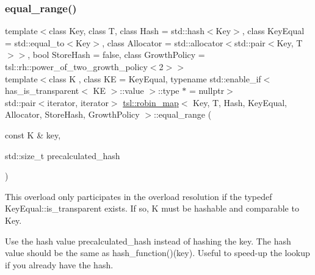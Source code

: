 \subsubsection{\texorpdfstring{equal\_range()}{equal\_range()}\hspace{0.1cm}{\footnotesize\ttfamily [4/6]}}
{\footnotesize\ttfamily template$<$class Key, class T, class Hash = std\+::hash$<$\+Key$>$, class Key\+Equal = std\+::equal\+\_\+to$<$\+Key$>$, class Allocator = std\+::allocator$<$std\+::pair$<$\+Key, T$>$$>$, bool Store\+Hash = false, class Growth\+Policy = tsl\+::rh\+::power\+\_\+of\+\_\+two\+\_\+growth\+\_\+policy$<$2$>$$>$ \\
template$<$class K , class KE  = Key\+Equal, typename std\+::enable\+\_\+if$<$ has\+\_\+is\+\_\+transparent$<$ K\+E $>$\+::value $>$\+::type $\ast$  = nullptr$>$ \\
std\+::pair$<$iterator, iterator$>$ \mbox{\hyperlink{classtsl_1_1robin__map}{tsl\+::robin\+\_\+map}}$<$ Key, T, Hash, Key\+Equal, Allocator, Store\+Hash, Growth\+Policy $>$\+::equal\+\_\+range (\begin{DoxyParamCaption}\item[{const K \&}]{key,  }\item[{std\+::size\+\_\+t}]{precalculated\+\_\+hash }\end{DoxyParamCaption})\hspace{0.3cm}{\ttfamily [inline]}}





This overload only participates in the overload resolution if the typedef Key\+Equal\+::is\+\_\+transparent exists. If so, K must be hashable and comparable to Key.

Use the hash value \textquotesingle{}precalculated\+\_\+hash\textquotesingle{} instead of hashing the key. The hash value should be the same as hash\+\_\+function()(key). Useful to speed-\/up the lookup if you already have the hash. \mbox{\label{classtsl_1_1robin__map_a7c8ee179d4ade6d69e13137c2acc8e9a}} 
